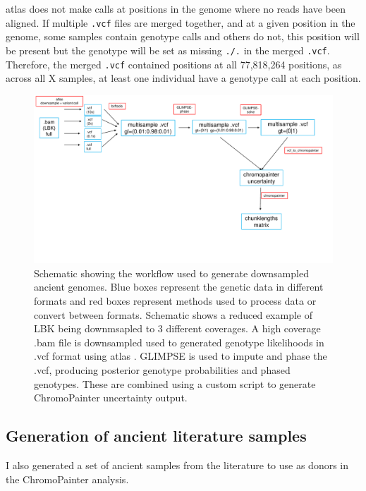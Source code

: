 {atlas does not make calls at positions in the genome where no reads have been aligned. If multiple \texttt{.vcf} files are merged together, and at a given position in the genome, some samples contain genotype calls and others do not, this position will be present but the genotype will be set as missing \texttt{./.} in  the merged \texttt{.vcf}. Therefore, the merged \texttt{.vcf} contained positions at all 77,818,264 positions, as across all X samples, at least one individual have a genotype call at each position. 


\begin{figure}[htp]
    \centering
    \includegraphics[width=1.0\textwidth]{../images/chapter1/workflow.pdf}
    \caption{Schematic showing the workflow used to generate downsampled ancient genomes. Blue boxes represent the genetic data in different formats and red boxes represent methods used to process data or convert between formats. Schematic shows a reduced example of LBK being downmsapled to 3 different coverages. A high coverage .bam file is downsampled used to generated genotype likelihoods in .vcf format using atlas \cite{Link2017}. GLIMPSE is used to impute and phase the .vcf, producing posterior genotype probabilities and phased genotypes. These are combined using a custom script to generate ChromoPainter uncertainty output.}
    \label{fig:Sensitivity_downsampled_rtgtools}
\end{figure}

\subsection{Generation of ancient literature samples} \label{AncientReferenceSamples}

I also generated a set of ancient samples from the literature to use as donors in the ChromoPainter analysis.

}
